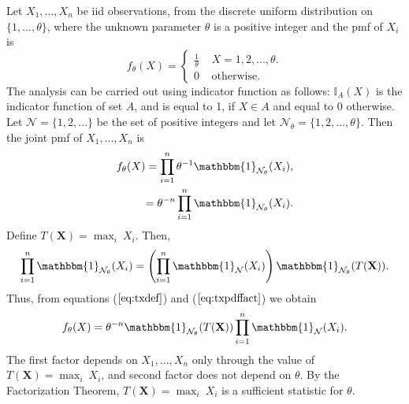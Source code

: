 \documentclass[a4paper,english,12pt]{article}
\newcommand{\bX}{\mathbf{X}}
\begin{document}
\begin{exmp}
Let $X_1,...,X_n$ be iid observations, from the discrete uniform distribution on $\{1,...,\theta\}$, where the unknown parameter $\theta$ is a positive integer and the pmf of $X_i$ is
\begin{equation*}
f_\theta(X) = 
\begin{cases} 
\frac{1}{\theta} ~~~~~ X=1,2,...,\theta. \\
0 ~~~~~\text{otherwise}.
\end{cases}
\end{equation*}
The analysis can be carried out using indicator function as follows:
$\mathbb{I}_A(X)$ is the indicator function of set $A$, and is equal to 1, if $X \in A$ and equal to 0 otherwise. Let $\mathcal{N} = \{1,2,...\}$ be the set of positive integers and let $\mathcal{N}_\theta =\{1,2,...,\theta \}$. Then the joint pmf of $X_1,...,X_n$ is 
\begin{eqnarray}
f_\theta(X) = \prod_{i=1}^{n}{\theta^{-1}\mathbbm{1}_{\mathcal{N}_\theta} (X_i)}, \nonumber \\
= \theta^{-n}\prod_{i=1}^{n}{\mathbbm{1}_{\mathcal{N}_\theta} (X_i)}.  \label{eq:txdef}
\end{eqnarray}
Define $T(\bX)=\displaystyle\max_i ~X_i$. Then,
\begin{eqnarray}
\prod_{i=1}^{n}{\mathbbm{1}_{\mathcal{N}_\theta} (X_i)}=\left(\prod_{i=1}^{n}{\mathbbm{1}_{\mathcal{N}} (X_i)}\right)\mathbbm{1}_{\mathcal{N}_\theta} (T(\bX)). \label{eq:txpdffact}
\end{eqnarray}
Thus, from equations ($ \ref{eq:txdef} $) and ($ \ref{eq:txpdffact} $) we obtain
\begin{equation}
f_\theta(X) = \theta^{-n}\mathbbm{1}_{\mathcal{N}_\theta} (T(\bX))\prod_{i=1}^{n}{\mathbbm{1}_{\mathcal{N}} (X_i)}.  
\end{equation}
The first factor depends on $X_1,...,X_n$ only through the value of $T(\bX)=\displaystyle\max_i ~X_i$, and second factor does not depend on $\theta$. By the Factorization Theorem, $T(\bX)=\displaystyle\max_i ~X_i$ is a sufficient statistic for $\theta$.
\end{exmp}
\end{document}
